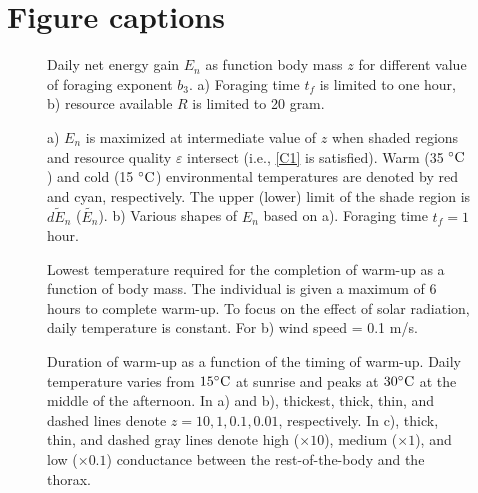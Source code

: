 \section*{Figure captions}
\begin{figure}[H]
\begin{center}
\caption{
	Daily net energy gain  $E_n$ as function body mass $z$ for different value of foraging exponent $b_3$.
	a) Foraging time $t_f$ is limited to one hour, b) resource available $R$ is limited to 20 gram.
}%
\label{fig1}
\end{center}
\end{figure}
\vspace{-1.5cm}
%
\begin{figure}[H]
\begin{center}
\caption{
	a)  $E_n$ is maximized at intermediate value of $z$  when shaded regions and resource quality $\varepsilon$ intersect (i.e., \cref{C1} is satisfied).
	Warm (35 $^{\circ} \rm{C}$) and cold (15 $^{\circ} \rm{C}$) environmental temperatures are denoted by red and cyan, respectively.
	The upper (lower) limit of the shade region is $\widetilde{dE_n}$ ($\widetilde{E_n}$).  
	b) Various shapes of $E_n$ based on a).
	Foraging time $t_f = 1$ hour.
	}%
\label{fig2}
\end{center}
\end{figure}
\vspace{-1.5cm}
%
\begin{figure}[H]
\begin{center}
\caption{
	Lowest temperature required for the completion of warm-up as a function of body mass.
	The individual is given a maximum of 6 hours to complete warm-up.
	To focus on the effect of solar radiation, daily temperature is constant.
	For b) wind speed = 0.1 m/s.
}%
\label{fig3}
\end{center}
\end{figure}
\vspace{-1.5cm}
%
\begin{figure}[H]
\begin{center}
\caption{
	Duration of warm-up as a function of the timing of warm-up.
	Daily temperature varies from $15 ^{\circ}\rm{C}$ at sunrise  and peaks at $30 ^{\circ}\rm{C}$ at the middle of the afternoon.
	In a) and b), thickest, thick, thin, and dashed lines denote  $z = 10, 1, 0.1, 0.01$,  respectively.
	In c), thick, thin, and dashed gray lines denote high ($\times 10$), medium ($\times 1$), and low ($\times 0.1$) conductance between the rest-of-the-body and the thorax.
}%
\label{fig4}
\end{center}
\end{figure}
